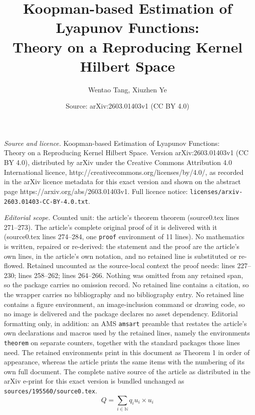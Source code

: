 \documentclass[10pt,a4paper]{amsart}
\title{Koopman-based Estimation of Lyapunov Functions: \\ Theory on a Reproducing Kernel Hilbert Space}
\author{Wentao Tang, Xiuzhen Ye}
\date{Source: arXiv:2603.01403v1 (CC BY 4.0)}
\newcommand{\mN}{\mbb{N}}
\newcommand{\mbb}[1]{\mathds{#1}} %
\begin{document}
\maketitle

\noindent\emph{Source and licence.} Koopman-based Estimation of Lyapunov Functions: \\ Theory on a Reproducing Kernel Hilbert Space. Version arXiv:2603.01403v1 (CC BY 4.0), distributed by arXiv under the Creative Commons Attribution 4.0 International licence, http://creativecommons.org/licenses/by/4.0/, as recorded in the arXiv licence metadata for this exact version and shown on the abstract page https://arxiv.org/abs/2603.01403v1. Full licence notice: \texttt{licenses/arxiv-2603.01403-CC-BY-4.0.txt}.\par\smallskip

\noindent\textit{Editorial scope.} Counted unit: the article's theorem theorem (source0.tex lines 271--273). The article's complete original proof of it is delivered with it (source0.tex lines 274--284, one \texttt{proof} environment of 11 lines). No mathematics is written, repaired or re-derived: the statement and the proof are the article's own lines, in the article's own notation, and no retained line is substituted or re-flowed.  Retained uncounted as the source-local context the proof needs: lines 227--230; lines 258--262; lines 264--266.  Nothing was omitted from any retained span, so the package carries no omission record.  No retained line contains a citation, so the wrapper carries no bibliography and no bibliography entry.  No retained line contains a figure environment, an image-inclusion command or drawing code, so no image is delivered and the package declares no asset dependency.  Editorial formatting only, in addition: an AMS \texttt{amsart} preamble that restates the article's own declarations and macros used by the retained lines, namely the environments \texttt{theorem} on separate counters, together with the standard packages those lines need.  The retained environments print in this document as Theorem 1 in order of appearance, whereas the article prints the same items with the numbering of its own full document.  The complete native source of the article as distributed in the arXiv e-print for this exact version is bundled unchanged as \texttt{sources/195560/source0.tex}.
    \begin{equation}\label{eq:HS}
        \textstyle
        Q = \sum_{i\in\mN} q_iu_i\times u_i
    \end{equation}
\end{document}
